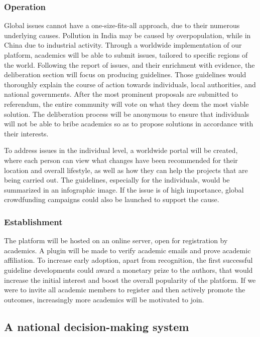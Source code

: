 \documentclass[a4paper,11pt]{article}
\begin{document}
\begin{multicols}{2}
\subsubsection{Operation} \label{operationacademics}

Global issues cannot have a one-size-fits-all approach, due to their numerous underlying causes. Pollution in India may be caused by overpopulation, while in China due to industrial activity. Through a worldwide implementation of our platform, academics will be able to submit issues, tailored to specific regions of the world. Following the report of issues, and their enrichment with evidence, the deliberation section will focus on producing guidelines. Those guidelines would thoroughly explain the course of action towards individuals, local authorities, and national governments. After the most prominent proposals are submitted to referendum, the entire community will vote on what they deem the most viable solution. The deliberation process will be anonymous to ensure that individuals will not be able to bribe academics so as to propose solutions in accordance with their interests.

To address issues in the individual level, a worldwide portal will be created, where each person can view what changes have been recommended for their location and overall lifestyle, as well as how they can help the projects that are being carried out. The guidelines, especially for the individuals, would be summarized in an infographic image. If the issue is of high importance, global crowdfunding campaigns could also be launched to support the cause.

\subsubsection{Establishment} \label{establishmentacademics}

The platform will be hosted on an online server, open for registration by academics. A plugin will be made to verify academic emails and prove academic affiliation. To increase early adoption, apart from recognition, the first successful guideline developments could award a monetary prize to the authors, that would increase the initial interest and boost the overall popularity of the platform. If we were to invite all academic members to register and then actively promote the outcomes, increasingly more academics will be motivated to join.

\subsection{A national decision-making system} \label{national}


\end{multicols}
\end{document}
